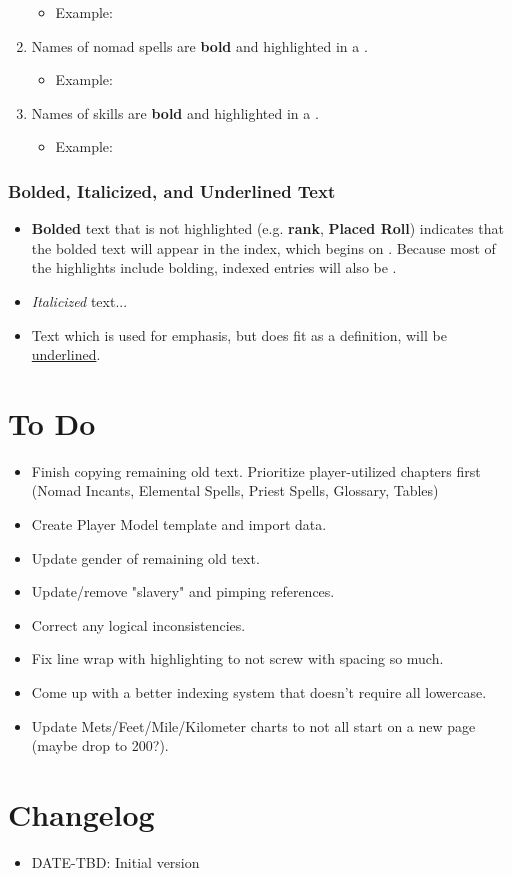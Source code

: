 \begin{enumerate}[leftmargin=12pt]
	\begin{itemize}\item Example: \end{itemize}
\item Names of nomad spells are \textbf{bold} and highlighted in a .
	\begin{itemize}\item Example: \end{itemize}
\item Names of skills are \textbf{bold} and highlighted in a .
	\begin{itemize}\item Example: \end{itemize}
\end{enumerate}
\subsubsection{Bolded, Italicized, and Underlined Text}
\begin{itemize}
\item \textbf{Bolded} text that is not highlighted (e.g. \textbf{rank}, \textbf{Placed Roll}) indicates that the bolded text will appear in the index, which begins on . Because most of the highlights include bolding, indexed entries will also be .
\item \textit{Italicized} text...
\item Text which is used for emphasis, but does fit as a definition, will be \ul{underlined}. 
\end{itemize}
\section{To Do}
\begin{itemize}
	\item Finish copying remaining old text. Prioritize player-utilized chapters first (Nomad Incants, Elemental Spells, Priest Spells, Glossary, Tables)
	\item Create Player Model template and import data.
	\item Update gender of remaining old text.
	\item Update/remove "slavery" and pimping references.
	\item Correct any logical inconsistencies.
	\item Fix line wrap with highlighting to not screw with spacing so much.
	\item Come up with a better indexing system that doesn't require all lowercase.
	\item Update Mets/Feet/Mile/Kilometer charts to not all start on a new page (maybe drop to 200?).
\end{itemize}
\section{Changelog}
\begin{itemize}[leftmargin=12pt]
\item DATE-TBD: Initial version
\end{itemize}